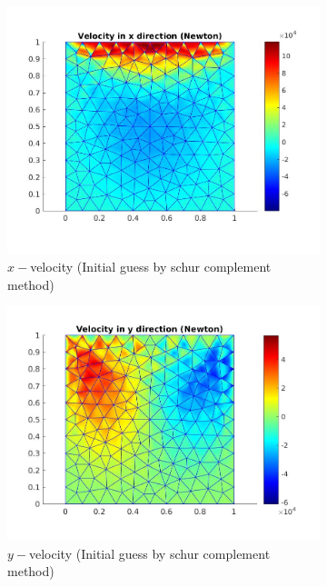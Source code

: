 \documentclass[a4paper]{book}
\begin{document}
\begin{figure}
\begin{subfigure}{0.5\textwidth}	
  \includegraphics[width=\linewidth]{lid_newton_vx_schur.jpg}
  \caption{$x-$velocity (Initial guess by schur complement method)}
  \label{x_vel_navier_stoke_schur_lid}
\end{subfigure}
\begin{subfigure}{0.5\textwidth}	
  \includegraphics[width=\linewidth]{lid_newton_vy_schur.jpg}
  \caption{$y-$velocity (Initial guess by schur complement method)}
  \label{y_vel_navier_stoke_schur_lid}
\end{subfigure}
\begin{subfigure}{\textwidth}	

\end{subfigure}
\end{figure}
\end{document}
